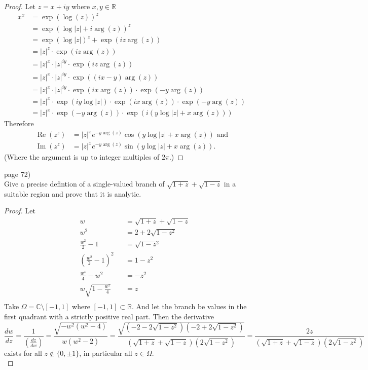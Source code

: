 \documentclass{article}
\newenvironment{problem}[2][Problem]{\begin{trivlist}
\item[\hskip \labelsep {\bfseries #1}\hskip \labelsep {\bfseries #2.}]}{\end{trivlist}}
\begin{document}
\begin{proof}
  Let $z = x + iy$ where $x,y\in\mathbb{R}$
  \begin{align*}
    x^x &= \exp(\log(z))^z \\
    &= \exp(\log|z| + i\arg(z))^z \\
    &= \exp(\log|z|)^z + \exp(iz\arg(z)) \\
    &= |z|^z \cdot \exp(iz\arg(z)) \\
    &= |z|^x \cdot |z|^{iy} \cdot \exp(iz\arg(z)) \\
    &= |z|^x \cdot |z|^{iy} \cdot \exp((ix-y)\arg(z)) \\
    &= |z|^x \cdot |z|^{iy} \cdot \exp(ix\arg(z)) \cdot \exp(-y\arg(z)) \\
    &= |z|^x \cdot \exp(iy\log|z|) \cdot \exp(ix\arg(z)) \cdot \exp(-y\arg(z)) \\
    &= |z|^x \cdot \exp(-y\arg(z)) \cdot \exp(i(y\log|z| + x\arg(z)))
  \end{align*}
  Therefore \begin{align*}
    \operatorname{Re}(z^z) &= |z|^x e^{-y\arg(z)} \cos(y\log|z| + x\arg(z)) \text{ and}\\
    \operatorname{Im}(z^z) &= |z|^x e^{-y\arg(z)} \sin(y\log|z| + x\arg(z)).
  \end{align*}
  (Where the argument is up to integer multiples of $2\pi$.)
\end{proof}
\pagebreak

\begin{problem}{1} (page 72) \\
  Give a precise defintion of a single-valued branch of
  $\sqrt{1 + z} + \sqrt{1 - z}$
  in a suitable region and prove that it is analytic.
\end{problem}

\begin{proof}
  Let \begin{alignat*}{2}
    &w &&= \sqrt{1 + z} + \sqrt{1 - z} \\
    &w^2 &&= 2 + 2\sqrt{1-z^2} \\
    &\frac{w^2}{2} - 1 &&= \sqrt{1 - z^2} \\
    &\left(\frac{w^2}{2} - 1\right)^2 &&= 1 - z^2 \\
    &\frac{w^4}{4} - w^2 &&= - z^2 \\
    &w\sqrt{1 - \frac{w^2}{4}} &&= z \\
  \end{alignat*}
  Take $\Omega = \mathbb{C} \setminus [-1, 1]$ where $[-1, 1] \subset \mathbb{R}$.
  And let the branch be values in the first quadrant with a strictly positive real part.
  Then the derivative \[
    \frac{dw}{dz} = \frac{1}{\left(\frac{dz}{dw}\right)}
    = \frac{\sqrt{-w^2(w^2 - 4)}}{w(w^2 - 2)}
    = \frac{
      \sqrt{(-2 - 2\sqrt{1-z^2})(-2 + 2\sqrt{1-z^2})}
      }{
      (\sqrt{1 + z} + \sqrt{1 - z})(2\sqrt{1-z^2})
    }
    = \frac{2z}{(\sqrt{1 + z} + \sqrt{1 - z})(2\sqrt{1-z^2})}
    \] exists for all $z \not \in \{0, \pm1\}$, in particular all $z \in \Omega$.\\
\end{proof}
\end{document}
